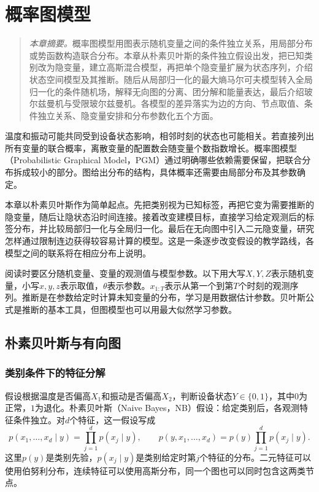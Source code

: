 \chapter{概率图模型}
\label{chap:graphical-models}
\begin{quote}\small
\textit{本章摘要。}概率图模型用图表示随机变量之间的条件独立关系，用局部分布或势函数构造联合分布。本章从朴素贝叶斯的条件独立假设出发，把已知类别改为隐变量，建立高斯混合模型，再把单个隐变量扩展为状态序列，介绍状态空间模型及其推断。随后从局部归一化的最大熵马尔可夫模型转入全局归一化的条件随机场，解释无向图的分离、团分解和能量表达，最后介绍玻尔兹曼机与受限玻尔兹曼机。各模型的差异落实为边的方向、节点取值、条件独立关系、隐变量安排和分布参数化五个方面。
\end{quote}

温度和振动可能共同受到设备状态影响，相邻时刻的状态也可能相关。若直接列出所有变量的联合概率，离散变量的配置数会随变量个数指数增长。概率图模型（Probabilistic Graphical Model，PGM）通过明确哪些依赖需要保留，把联合分布拆成较小的部分\cite{bishop2006pattern,murphy2022pml}。图给出分布的结构，具体概率还需要由局部分布及其参数确定。

本章以朴素贝叶斯作为简单起点。先把类别视为已知标签，再把它变为需要推断的隐变量，随后让隐状态沿时间连接。接着改变建模目标，直接学习给定观测后的标签分布，并比较局部归一化与全局归一化。最后在无向图中引入二元隐变量，研究怎样通过限制连边获得较容易计算的模型。这是一条逐步改变假设的教学路线，各模型之间的联系将在相应分布上说明。

阅读时要区分随机变量、变量的观测值与模型参数。以下用大写$X,Y,Z$表示随机变量，小写$x,y,z$表示取值，$\theta$表示参数。$x_{1:T}$表示从第一个到第$T$个时刻的观测序列。推断是在参数给定时计算未知变量的分布，学习是用数据估计参数。贝叶斯公式是推断的基本工具，但图模型也可以用最大似然学习参数。

\section{朴素贝叶斯与有向图}
\subsection{类别条件下的特征分解}
假设根据温度是否偏高$X_1$和振动是否偏高$X_2$，判断设备状态$Y\in\{0,1\}$，其中$0$为正常，$1$为退化。朴素贝叶斯（Naive Bayes，NB）假设：给定类别后，各观测特征条件独立。对$d$个特征，这一假设写成
\begin{equation}
 p(x_1,\ldots,x_d\mid y)=\prod_{j=1}^d p(x_j\mid y),
 \qquad p(y,x_1,\ldots,x_d)=p(y)\prod_{j=1}^d p(x_j\mid y).
 \label{eq:bayes-naive-joint}
\end{equation}
这里$p(y)$是类别先验，$p(x_j\mid y)$是类别给定时第$j$个特征的分布。二元特征可以使用伯努利分布，连续特征可以使用高斯分布，同一个图也可以同时包含这两类节点。

